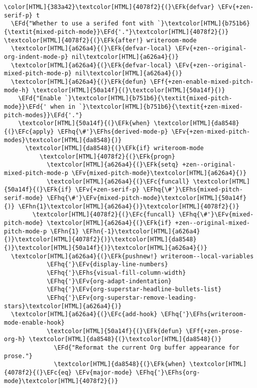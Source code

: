 \documentclass{scrartcl}
\newcommand{\EFk}[1]{\textcolor{EFk}{#1}} %
\newcommand{\EFd}[1]{\textcolor{EFd}{\textit{#1}}} %
\newcommand{\EFc}[1]{\textcolor{EFc}{#1}} %
\newcommand{\EFv}[1]{\textcolor{EFv}{#1}} %
\newcommand{\EFf}[1]{\textcolor{EFf}{#1}} %
\newcommand{\EFhn}[1]{\textcolor{EFhn}{\textbf{#1}}} %
\newcommand{\EFhq}[1]{\textcolor{EFhq}{#1}} %
\newcommand{\EFhs}[1]{\textcolor{EFhs}{#1}} %
\begin{document}
\begin{Code}
\begin{Verbatim}[]
\color[HTML]{383a42}\textcolor[HTML]{4078f2}{(}\EFk{defvar} \EFv{+zen-serif-p} t
  \EFd{"Whether to use a serifed font with `}\textcolor[HTML]{b751b6}{\textit{mixed-pitch-mode}}\EFd{'."}\textcolor[HTML]{4078f2}{)}
\textcolor[HTML]{4078f2}{(}\EFk{after!} writeroom-mode
  \textcolor[HTML]{a626a4}{(}\EFk{defvar-local} \EFv{+zen--original-org-indent-mode-p} nil\textcolor[HTML]{a626a4}{)}
  \textcolor[HTML]{a626a4}{(}\EFk{defvar-local} \EFv{+zen--original-mixed-pitch-mode-p} nil\textcolor[HTML]{a626a4}{)}
  \textcolor[HTML]{a626a4}{(}\EFk{defun} \EFf{+zen-enable-mixed-pitch-mode-h} \textcolor[HTML]{50a14f}{(}\textcolor[HTML]{50a14f}{)}
    \EFd{"Enable `}\textcolor[HTML]{b751b6}{\textit{mixed-pitch-mode}}\EFd{' when in `}\textcolor[HTML]{b751b6}{\textit{+zen-mixed-pitch-modes}}\EFd{'."}
    \textcolor[HTML]{50a14f}{(}\EFk{when} \textcolor[HTML]{da8548}{(}\EFc{apply} \EFhq{\#'}\EFhs{derived-mode-p} \EFv{+zen-mixed-pitch-modes}\textcolor[HTML]{da8548}{)}
      \textcolor[HTML]{da8548}{(}\EFk{if} writeroom-mode
          \textcolor[HTML]{4078f2}{(}\EFk{progn}
            \textcolor[HTML]{a626a4}{(}\EFk{setq} +zen--original-mixed-pitch-mode-p \EFv{mixed-pitch-mode}\textcolor[HTML]{a626a4}{)}
            \textcolor[HTML]{a626a4}{(}\EFc{funcall} \textcolor[HTML]{50a14f}{(}\EFk{if} \EFv{+zen-serif-p} \EFhq{\#'}\EFhs{mixed-pitch-serif-mode} \EFhq{\#'}\EFv{mixed-pitch-mode}\textcolor[HTML]{50a14f}{)} \EFhn{1}\textcolor[HTML]{a626a4}{)}\textcolor[HTML]{4078f2}{)}
        \textcolor[HTML]{4078f2}{(}\EFc{funcall} \EFhq{\#'}\EFv{mixed-pitch-mode} \textcolor[HTML]{a626a4}{(}\EFk{if} +zen--original-mixed-pitch-mode-p \EFhn{1} \EFhn{-1}\textcolor[HTML]{a626a4}{)}\textcolor[HTML]{4078f2}{)}\textcolor[HTML]{da8548}{)}\textcolor[HTML]{50a14f}{)}\textcolor[HTML]{a626a4}{)}
  \textcolor[HTML]{a626a4}{(}\EFk{pushnew!} writeroom--local-variables
            \EFhq{'}\EFv{display-line-numbers}
            \EFhq{'}\EFhs{visual-fill-column-width}
            \EFhq{'}\EFv{org-adapt-indentation}
            \EFhq{'}\EFv{org-superstar-headline-bullets-list}
            \EFhq{'}\EFv{org-superstar-remove-leading-stars}\textcolor[HTML]{a626a4}{)}
  \textcolor[HTML]{a626a4}{(}\EFc{add-hook} \EFhq{'}\EFhs{writeroom-mode-enable-hook}
            \textcolor[HTML]{50a14f}{(}\EFk{defun} \EFf{+zen-prose-org-h} \textcolor[HTML]{da8548}{(}\textcolor[HTML]{da8548}{)}
              \EFd{"Reformat the current Org buffer appearance for prose."}
              \textcolor[HTML]{da8548}{(}\EFk{when} \textcolor[HTML]{4078f2}{(}\EFc{eq} \EFv{major-mode} \EFhq{'}\EFhs{org-mode}\textcolor[HTML]{4078f2}{)}

\end{Verbatim}
\end{Code}
\end{document}
